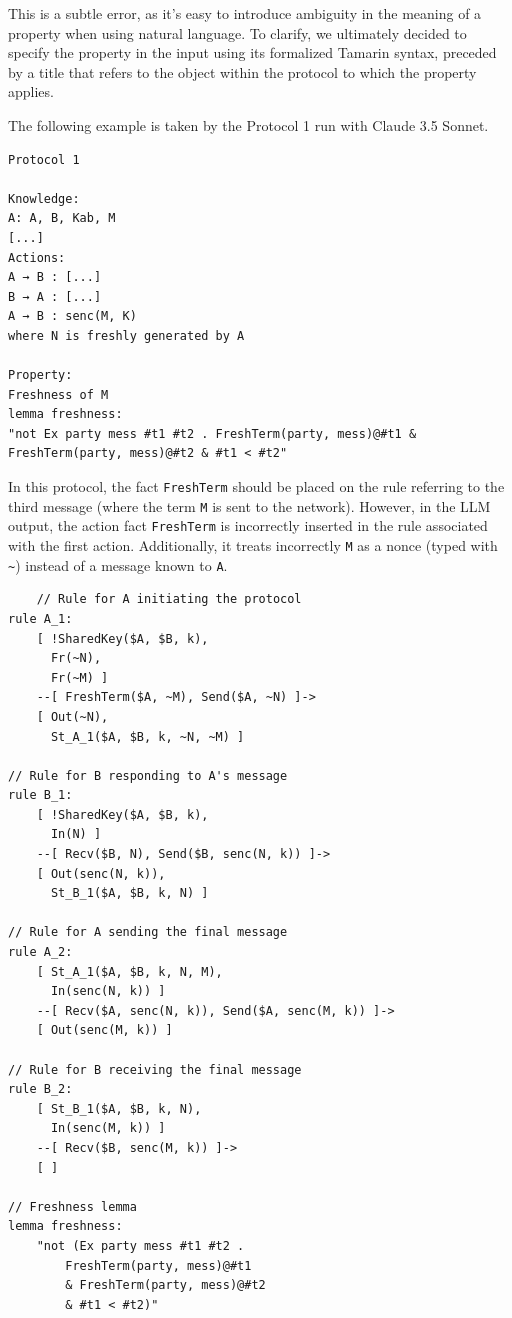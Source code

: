 \begin{Example}
\label{Ex:bad_observable_placements}
This is a subtle error, as it's easy to introduce ambiguity in the meaning of a property when using natural language. To clarify, we ultimately decided to specify the property in the input using its formalized Tamarin syntax, preceded by a title that refers to the object within the protocol to which the property applies.

The following example is taken by the Protocol 1 run with Claude 3.5 Sonnet.
\begin{verbatim}
Protocol 1

Knowledge:
A: A, B, Kab, M
[...]
Actions:
A → B : [...]
B → A : [...]
A → B : senc(M, K)
where N is freshly generated by A

Property:
Freshness of M
lemma freshness:
"not Ex party mess #t1 #t2 . FreshTerm(party, mess)@#t1 &
FreshTerm(party, mess)@#t2 & #t1 < #t2"
\end{verbatim}

In this protocol, the fact \texttt{FreshTerm} should be placed on the rule referring to the third message (where the term \texttt{M} is sent to the network).  However, in the LLM output, the action fact \texttt{FreshTerm} is incorrectly inserted in the rule associated with the first action. Additionally, it treats incorrectly \texttt{M} as a nonce (typed with \texttt{\~}) instead of a message known to \texttt{A}.
\begin{verbatim}
    // Rule for A initiating the protocol
rule A_1:
    [ !SharedKey($A, $B, k),
      Fr(~N),
      Fr(~M) ]
    --[ FreshTerm($A, ~M), Send($A, ~N) ]->
    [ Out(~N),
      St_A_1($A, $B, k, ~N, ~M) ]

// Rule for B responding to A's message
rule B_1:
    [ !SharedKey($A, $B, k),
      In(N) ]
    --[ Recv($B, N), Send($B, senc(N, k)) ]->
    [ Out(senc(N, k)),
      St_B_1($A, $B, k, N) ]

// Rule for A sending the final message
rule A_2:
    [ St_A_1($A, $B, k, N, M),
      In(senc(N, k)) ]
    --[ Recv($A, senc(N, k)), Send($A, senc(M, k)) ]->
    [ Out(senc(M, k)) ]

// Rule for B receiving the final message
rule B_2:
    [ St_B_1($A, $B, k, N),
      In(senc(M, k)) ]
    --[ Recv($B, senc(M, k)) ]->
    [ ]

// Freshness lemma
lemma freshness:
    "not (Ex party mess #t1 #t2 . 
        FreshTerm(party, mess)@#t1 
        & FreshTerm(party, mess)@#t2 
        & #t1 < #t2)"

\end{verbatim}
\end{Example}

